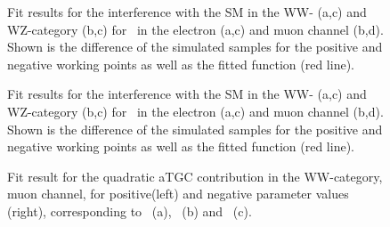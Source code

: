 \begin{figure}
	\centering
	\caption[Fit results for the interference with the SM in the WW- and WZ-category for \Tccw \ , electron and muon channel]{Fit results for the interference with the SM in the WW- (a,c) and WZ-category (b,c) for \Tccw \ in the electron (a,c) and muon channel (b,d). Shown is the difference of the simulated samples for the positive and negative working points as well as the fitted function (red line).}
\end{figure}	

\begin{figure}
	\centering
	\caption[Fit results for the interference with the SM in the WW- and WZ-category for \Tcb \ , electron and muon channel]{Fit results for the interference with the SM in the WW- (a,c) and WZ-category (b,c) for \Tcb \ in the electron (a,c) and muon channel (b,d). Shown is the difference of the simulated samples for the positive and negative working points as well as the fitted function (red line).}
\end{figure}	


\newpage


\begin{figure}
	\centering
	\caption[Fit result for the quadratic aTGC contribution in the WW-category, muon channel]{Fit result for the quadratic aTGC contribution in the WW-category, muon channel, for positive(left) and negative parameter values (right), corresponding to \Tcwww \ (a), \Tccw \ (b) and \Tcb \ (c).}
\end{figure}
		
